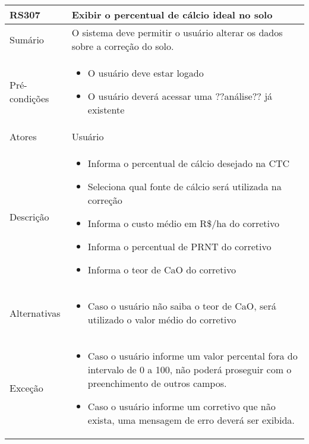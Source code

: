 \begin{quadro}[!htb]
    \begin{tabular}{|p{3cm}|p{11cm}|}
        \hline
        \textbf{RS307} & \textbf{Exibir o percentual de cálcio ideal no solo} \\
        \hline
        Sumário        & O sistema deve permitir o usuário alterar os dados sobre a correção do solo.                  \\
        \hline
        Pré-condições  & \begin{itemize}
            \item O usuário deve estar logado
            \item O usuário deverá acessar uma ??análise?? já existente 
        \end{itemize}                 \\
        \hline
        Atores         & Usuário                  \\
        \hline
        Descrição      &
        \begin{itemize}
            \item Informa o percentual de cálcio desejado na CTC
            \item Seleciona qual fonte de cálcio será utilizada na correção
            \item Informa o custo médio em R\$/ha do corretivo
            \item Informa o percentual de PRNT do corretivo
            \item Informa o teor de CaO do corretivo
        \end{itemize}                 \\
        \hline
        Alternativas   &
        \begin{itemize}
            \item Caso o usuário não saiba o teor de CaO, será utilizado o valor médio do corretivo
        \end{itemize}                 \\
        \hline
        Exceção        &
        \begin{itemize}
            \item Caso o usuário informe um valor percental fora do intervalo de 0 a 100, não poderá proseguir com o preenchimento de outros campos.
            \item Caso o usuário informe um corretivo que não exista, uma mensagem de erro deverá ser exibida.
        \end{itemize}                   \\
        \hline
    \end{tabular}
\end{quadro}

